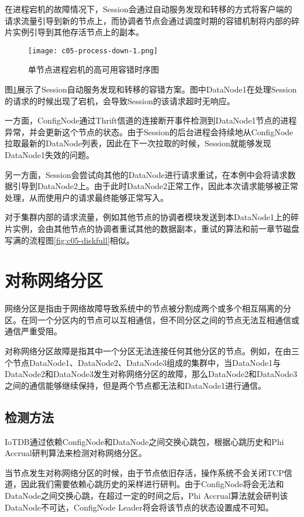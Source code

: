 在进程宕机的故障情况下，Session会通过自动服务发现和转移的方式将客户端的请求流量引导到新的节点上，而协调者节点会通过调度时期的容错机制将内部的碎片实例引导到其他存活节点上的副本。

\begin{figure}
    \centering
    \texttt{[image: c05-process-down-1.png]}
    \caption{单节点进程宕机的高可用容错时序图}
    \label{fig:c05-process-down-1}
\end{figure}

图\ref{fig:c05-process-down-1}展示了Session自动服务发现和转移的容错方案。图中DataNode1在处理Session的请求的时候出现了宕机，会导致Session的该请求超时无响应。

一方面，ConfigNode通过Thrift信道的连接断开事件检测到DataNode1节点的进程异常，并会更新这个节点的状态。由于Session的后台进程会持续地从ConfigNode拉取最新的DataNode列表，因此在下一次拉取的时候，Session就能够发现DataNode1失效的问题。

另一方面，Session会尝试向其他的DataNode进行请求重试，在本例中会将请求数据引导到DataNode2上。由于此时DataNode2正常工作，因此本次请求能够被正常处理，从而使用户的请求最终能够正常写入。


对于集群内部的请求流量，例如其他节点的协调者模块发送到本DataNode1上的碎片实例，会由其他节点的协调者重试其他的数据副本，重试的算法和前一章节磁盘写满的流程图\ref{fig:c05-diskfull}相似。

\section{对称网络分区}

网络分区是指由于网络故障导致系统中的节点被分割成两个或多个相互隔离的分区。在同一个分区内的节点可以互相通信，但不同分区之间的节点无法互相通信或通信严重受阻。

对称网络分区故障是指其中一个分区无法连接任何其他分区的节点。例如，在由三个节点DataNode1、DataNode2、DataNode3组成的集群中，当DataNode1与DataNode2和DataNode3发生对称网络分区的故障，那么DataNode2和DataNode3之间的通信能够继续保持，但是两个节点都无法和DataNode1进行通信。

\subsection{检测方法}

IoTDB通过依赖ConfigNode和DataNode之间交换心跳包，根据心跳历史和Phi Accrual研判算法来检测对称网络分区。

当节点发生对称网络分区的时候，由于节点依旧存活，操作系统不会关闭TCP信道，因此我们需要依赖心跳历史的采样进行研判。由于ConfigNode将会无法和DataNode之间交换心跳，在超过一定的时间之后，Phi Accrual算法就会研判该DataNode不可达，ConfigNode Leader将会将该节点的状态设置成不可知。


